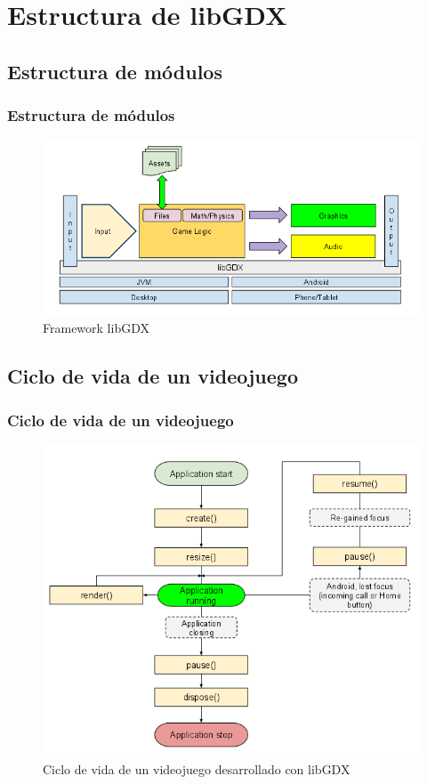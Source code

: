 \documentclass[xcolor={dvipsnames}]{beamer}
\begin{document}
\section{Estructura de libGDX} 
\subsection{Estructura de módulos}
\begin{frame}\frametitle{Estructura de módulos}
    \begin{figure}
    \includegraphics[scale=0.4]{images/modules_overview} 
    \caption{Framework libGDX}
    \end{figure}
\end{frame}

\subsection{Ciclo de vida de un videojuego}
\begin{frame}[plain]\frametitle{Ciclo de vida de un videojuego}
    \begin{figure}
    \includegraphics[scale=0.4]{images/libgdx_lifecycle} 
    \caption{Ciclo de vida de un videojuego desarrollado con libGDX}
    \end{figure}
\end{frame}
\end{document}
